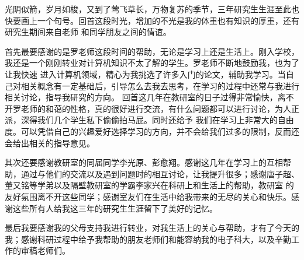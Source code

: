 
\thesisacknowledgement
光阴似箭，岁月如梭，又到了莺飞草长，万物复苏的季节，三年研究生生涯至此也快要画上一个句号。回首这段时光，增加的不光是我的体重也有知识的厚重，还有研究生期间来自老师
和同学朋友之间的情谊。

首先最要感谢的是罗老师这段时间的帮助，无论是学习上还是生活上。刚入学校，我还是一个刚刚转业对计算机知识不太了解的学生。罗老师不断地鼓励我，也为了让我快速
进入计算机领域，精心为我挑选了许多入门的论文，辅助我学习。当自己对相关概念有一定基础后，引导怎么去我去思考，在学习的过程中还常与我进行相关讨论，指导我研究的方向。
回首这几年在教研室的日子过得非常愉快，离不开罗老师的和蔼的性格，真的很好进行交流，有什么问题都可以进行讨论，为人正派，深得我们几个学生私下偷偷拍马屁。同时还给予
我们在学习上非常大的自由度。可以凭借自己的兴趣爱好选择学习的方向，并不会给我们过多的限制，反而还会给出相关的指导意见。

其次还要感谢教研室的同届同学李光原、彭愈翔。感谢这几年在学习上的互相帮助，通过与他们的交流以及遇到问题时的相互讨论，让我提升很多；感谢唐子超、董又铭等学弟以及隔壁教研室的学霸李家兴在科研上和生活上的帮助，教研室
的友好氛围离不开这些同学；感谢室友们在生活中给我带来的无尽的关心和快乐。感谢这些所有人给我这三年的研究生生涯留下了美好的记忆。

最后我要感谢我的父母支持我进行转业，对我生活上的关心与帮助，才有了今天的我；感谢科研过程中给予我帮助的朋友老师们和能容纳我的电子科大，以及辛勤工作的审稿老师们。
